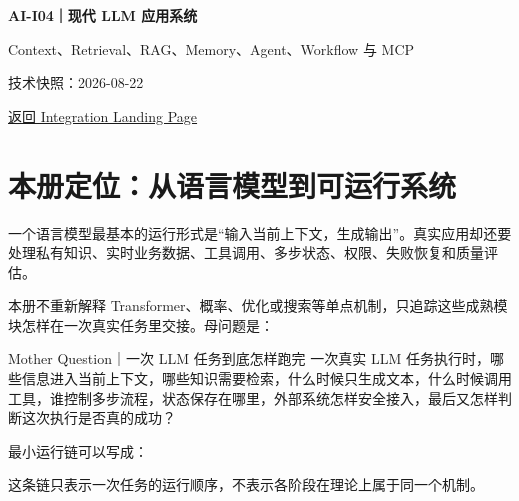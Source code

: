 \documentclass[profile=standard,twoside=false]{ipara-handbook}
\begin{document}
\begin{titlepage}
  \centering
  \vspace*{0.16\textheight}
  {\Huge\bfseries\sffamily AI-I04｜现代 LLM 应用系统\par}
  \vspace{0.8em}
  {\Large Context、Retrieval、RAG、Memory、Agent、Workflow 与 MCP\par}
  \vspace{1.6em}
  {\small 技术快照：2026-08-22\par}
  \vspace{1.1em}
  {\small\href{../../40_复试/10_人工智能与机器学习/90_综合专题/AI-I04_现代LLM应用系统/README.md}{返回 Integration Landing Page}\par}
\end{titlepage}

\tableofcontents

\section{本册定位：从语言模型到可运行系统}

一个语言模型最基本的运行形式是“输入当前上下文，生成输出”。真实应用却还要处理私有知识、实时业务数据、工具调用、多步状态、权限、失败恢复和质量评估。

本册不重新解释 Transformer、概率、优化或搜索等单点机制，只追踪这些成熟模块怎样在一次真实任务里交接。母问题是：

\begin{mentalmodel}{Mother Question｜一次 LLM 任务到底怎样跑完}
一次真实 LLM 任务执行时，哪些信息进入当前上下文，哪些知识需要检索，什么时候只生成文本，什么时候调用工具，谁控制多步流程，状态保存在哪里，外部系统怎样安全接入，最后又怎样判断这次执行是否真的成功？
\end{mentalmodel}

最小运行链可以写成：

\begin{processchain}
\end{processchain}

这条链只表示一次任务的运行顺序，不表示各阶段在理论上属于同一个机制。

\begin{handbookdiagram}
\centering

\end{handbookdiagram}
\end{document}
